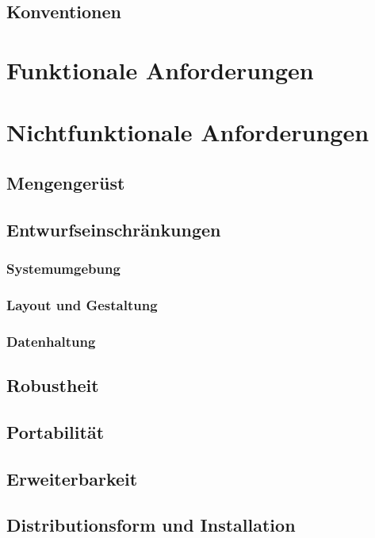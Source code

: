 \documentclass[a4paper,10pt,titlepage]{article}
\begin{document}
\subsection{Konventionen}

\section{Funktionale Anforderungen}

\clearpage
\section{Nichtfunktionale Anforderungen}
\subsection{Mengengerüst}
\label{Mengengeruest}

\subsection{Entwurfseinschränkungen}
\subsubsection{Systemumgebung}

\subsubsection{Layout und Gestaltung}

\subsubsection{Datenhaltung}
\label{datenhaltung}

\subsection{Robustheit}

\subsection{Portabilität}

\subsection{Erweiterbarkeit}

\subsection{Distributionsform und Installation}
\end{document}
